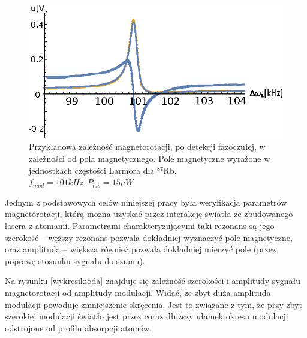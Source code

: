\documentclass[a4paper,10pt]{article}
\begin{document}
\begin{figure}[h!]
\centering
 \includegraphics[width=\textwidth]{magnetorot1.eps}
 \caption{Przykładowa zależność magnetorotacji, po detekcji fazoczułej, w zależności od pola magnetycznego. Pole magnetyczne wyrażone w jednostkach częstości Larmora dla ${}^{87} \mathrm{Rb}$.
 $f_{mod}=101kHz, P_{las}=15 \mu W$}
 \label{fig:magnetorot1}
\end{figure}

Jednym z podstawowych celów niniejszej pracy była weryfikacja parametrów magnetorotacji, którą można uzyskać przez interakcję światła ze zbudowanego lasera z atomami.
Parametrami charakteryzującymi taki rezonans są jego  szerokość -- węższy rezonans pozwala dokładniej wyznaczyć pole magnetyczne, oraz amplituda -- większa również pozwala dokładniej mierzyć pole (przez poprawę stosunku sygnału do szumu).

Na rysunku \ref{wykresikioda} znajduje się zależność szerokości i amplitudy sygnału magnetorotacji od amplitudy modulacji. Widać, że zbyt duża amplituda modulacji powoduje zmniejszenie skręcenia. Jest to związane z tym, że przy zbyt szerokiej modulacji światło jest przez coraz dłuższy ułamek okresu modulacji odstrojone od profilu absorpcji atomów. 
\end{document}
